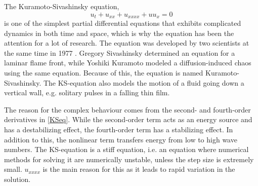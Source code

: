 The Kuramoto-Sivashinsky equation,
\begin{equation}
\label{KSeq}
u_t + u_{xx} + u_{xxxx} + uu_{x} = 0 
\end{equation}
is one of the simplest partial differential equations that exhibits complicated dynamics in both time and space, which is why the equation has been the attention for a lot of research. The equation was developed by two scientists at the same time in 1977 \cite{development}. Gregory Sivashinsky determined an equation for a laminar flame front, while Yoshiki Kuramoto modeled a diffusion-induced chaos using the same equation. Because of this, the equation is named Kuramoto-Sivashinsky. The KS-equation also models the motion of a fluid going down a vertical wall, e.g. solitary pulses in a falling thin film. \cite{trivia}

The reason for the complex behaviour comes from the second- and fourth-order derivatives in \eqref{KSeq}. While the second-order term acts as an energy source and has a destabilizing effect, the fourth-order term has a stabilizing effect. In addition to this, the nonlinear term transfers energy from low to high wave numbers. \cite{stabil} The KS-equation is a stiff equation, i.e. an equation where numerical methods for solving it are numerically unstable, unless the step size is extremely small. $u_{xxxx}$ is the main reason for this as it leads to rapid variation in the solution.







